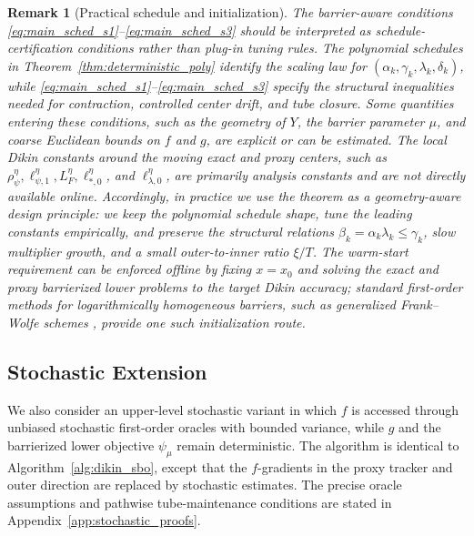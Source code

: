 \documentclass{article}
\newtheorem{remark}{Remark}
\begin{document}
\begin{remark}[Practical schedule and initialization]
The \textit{barrier-aware} conditions \eqref{eq:main_sched_s1}--\eqref{eq:main_sched_s3} should be
interpreted as schedule-certification conditions rather than plug-in tuning rules. The polynomial
schedules in Theorem~\ref{thm:deterministic_poly} identify the scaling law for
\((\alpha_k,\gamma_k,\lambda_k,\delta_k)\), while
\eqref{eq:main_sched_s1}--\eqref{eq:main_sched_s3} specify the structural inequalities needed for
contraction, controlled center drift, and tube closure. Some quantities entering these conditions,
such as the geometry of \(Y\), the barrier parameter \(\mu\), and coarse Euclidean bounds on \(f\)
and \(g\), are explicit or can be estimated. The local Dikin constants around the moving exact and
proxy centers, such as \(\rho_{\psi}^{\eta},\ell_{\psi,1}^{\eta},L_F^{\eta},
\ell_{*,0}^{\eta}\), and \(\ell_{\lambda,0}^{\eta}\), are primarily analysis constants and are not directly
available online. Accordingly, in practice we use the theorem as a geometry-aware design principle:
we keep the polynomial schedule shape, tune the leading constants empirically, and preserve the
structural relations \(\beta_k=\alpha_k\lambda_k\le\gamma_k\), slow multiplier growth, and a small
outer-to-inner ratio \(\xi/T\). The warm-start requirement can be enforced offline by fixing
\(x=x_0\) and solving the exact and proxy barrierized lower problems to the target Dikin accuracy;
standard first-order methods for logarithmically homogeneous barriers, such as generalized
Frank--Wolfe schemes \citep{zhao2023analysis}, provide one such initialization route.
\end{remark}

\subsection{Stochastic Extension}
\label{sec:stoch_upper}

We also consider an upper-level stochastic variant in which \(f\) is accessed through unbiased
stochastic first-order oracles with bounded variance, while \(g\) and the barrierized lower objective
\(\psi_\mu\) remain deterministic. The algorithm is identical to Algorithm~\ref{alg:dikin_sbo}, except that
the \(f\)-gradients in the proxy tracker and outer direction are replaced by stochastic estimates.
The precise oracle assumptions and pathwise tube-maintenance conditions are stated in
Appendix~\ref{app:stochastic_proofs}.
\end{document}
